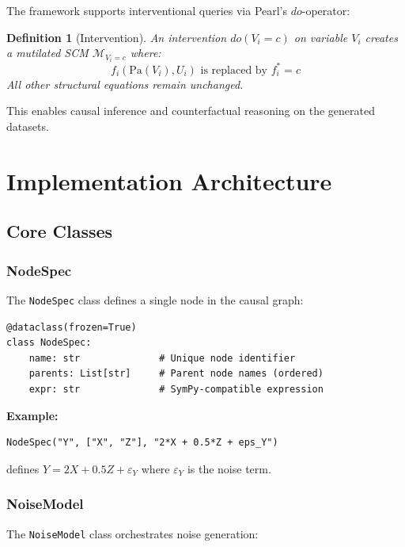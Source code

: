 \documentclass[11pt,a4paper]{article}
\newtheorem{definition}{Definition}[section]
\begin{document}
The framework supports interventional queries via Pearl's $do$-operator:

\begin{definition}[Intervention]
An intervention $do(V_i = c)$ on variable $V_i$ creates a mutilated SCM $\mathcal{M}_{V_i=c}$ where:
\[
f_i(\text{Pa}(V_i), U_i) \text{ is replaced by } f_i^* = c
\]
All other structural equations remain unchanged.
\end{definition}

This enables causal inference and counterfactual reasoning on the generated datasets.

\section{Implementation Architecture}

\subsection{Core Classes}

\subsubsection{NodeSpec}

The \texttt{NodeSpec} class defines a single node in the causal graph:

\begin{lstlisting}[caption={NodeSpec Structure}]
@dataclass(frozen=True)
class NodeSpec:
    name: str              # Unique node identifier
    parents: List[str]     # Parent node names (ordered)
    expr: str              # SymPy-compatible expression
\end{lstlisting}

\textbf{Example:}
\begin{lstlisting}
NodeSpec("Y", ["X", "Z"], "2*X + 0.5*Z + eps_Y")
\end{lstlisting}
defines $Y = 2X + 0.5Z + \varepsilon_Y$ where $\varepsilon_Y$ is the noise term.

\subsubsection{NoiseModel}

The \texttt{NoiseModel} class orchestrates noise generation:
\end{document}

